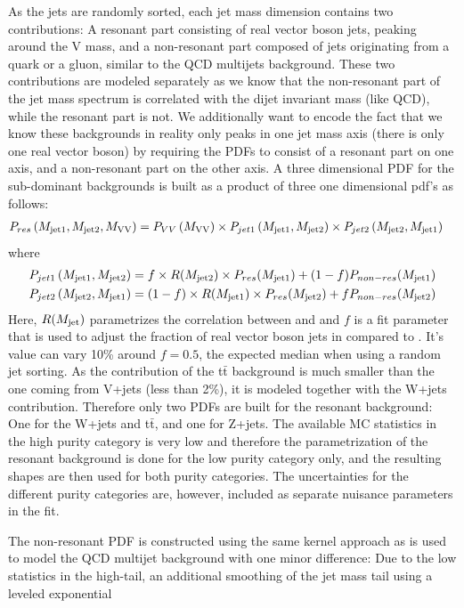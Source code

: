 As the jets are randomly sorted, each jet mass dimension contains two contributions: A resonant part consisting of real vector boson jets, peaking around the V mass, and a non-resonant part composed of jets originating from a quark or a gluon, similar to the QCD multijets background. These two contributions are modeled separately as we know that the non-resonant part of the jet mass spectrum is correlated with the dijet invariant mass (like QCD), while the resonant part is not. We additionally want to encode the fact that we know these backgrounds in reality only peaks in one jet mass axis (there is only one real vector boson) by requiring the PDFs to consist of a resonant part on one axis, and a non-resonant part on the other axis. A three dimensional PDF for the sub-dominant backgrounds is built as a product of three one dimensional pdf's as follows:
\begin{align}
	\label{eq:searchIII:vjetpdf}
	P_{res} \left(M_{\rm jet1}, M_{\rm jet2}, M_{\rm VV} \right) &= P_{VV} \left( M_{\rm VV} \right) \times  P_{jet1} \left( M_{\rm jet1}, M_{\rm jet2} \right) \times P_{jet2} \left( M_{\rm jet2}, M_{\rm jet1} \right)
\end{align}
where
\begin{align}
P_{jet1} \left( M_{\rm jet1}, M_{\rm jet2} \right) &= f \times R(M_{\rm jet2}) \times P_{res} ( M_{\rm jet1} ) + (1-f) P_{non-res} (M_{\rm jet1} ) \\
P_{jet2} \left( M_{\rm jet2}, M_{\rm jet1} \right) &= (1-f) \times R(M_{\rm jet1}) \times P_{res} ( M_{\rm jet2} ) + f P_{non-res} (M_{\rm jet2} )
\end{align}
Here, $R(M_{\rm jet})$ parametrizes the correlation between \MJO and \MJT and $f$ is a fit parameter that is used to adjust the fraction of real vector boson jets in
\MJO compared to \MJT. It's value can vary 10\% around $f=0.5$, the expected median when using a random jet sorting.\newline
As the contribution of the t$\bar{\text{t}}$ background is much smaller than the one coming from V+jets (less than 2\%), it is modeled together with the W+jets contribution. Therefore only two PDFs are built for the resonant background: One for the W+jets and t$\bar{\text{t}}$, and one for Z+jets.\newline
The available MC statistics in the high purity category is very low and therefore the parametrization of the resonant background is done for the low purity category only, and the resulting shapes are then used for both purity categories. The uncertainties for the different purity categories are, however, included as separate nuisance parameters in the fit.\par
The non-resonant \MVV PDF is constructed using the same kernel approach as is used to model the QCD multijet background with one minor difference: Due to the low statistics in the high-\MVV tail, an additional smoothing of the jet mass tail using a leveled exponential
